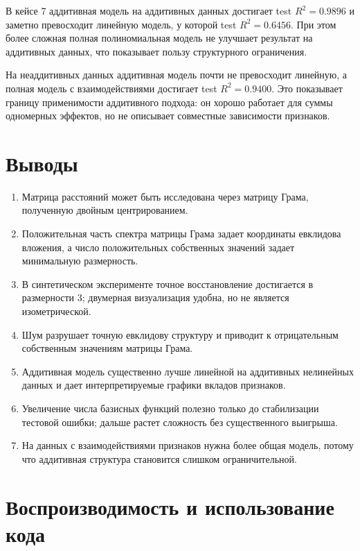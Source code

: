 \documentclass[12pt,a4paper]{article}
\begin{document}
В кейсе 7 аддитивная модель на аддитивных данных достигает test \(R^2=0.9896\)
и заметно превосходит линейную модель, у которой test \(R^2=0.6456\). При этом
более сложная полная полиномиальная модель не улучшает результат на аддитивных
данных, что показывает пользу структурного ограничения.

На неаддитивных данных аддитивная модель почти не превосходит линейную, а
полная модель с взаимодействиями достигает test \(R^2=0.9400\). Это показывает
границу применимости аддитивного подхода: он хорошо работает для суммы
одномерных эффектов, но не описывает совместные зависимости признаков.

\section{Выводы}

\begin{enumerate}[label=\arabic*)]
    \item Матрица расстояний может быть исследована через матрицу Грама,
    полученную двойным центрированием.

    \item Положительная часть спектра матрицы Грама задает координаты
    евклидова вложения, а число положительных собственных значений задает
    минимальную размерность.

    \item В синтетическом эксперименте точное восстановление достигается
    в размерности \(3\); двумерная визуализация удобна, но не является
    изометрической.

    \item Шум разрушает точную евклидову структуру и приводит к отрицательным
    собственным значениям матрицы Грама.

    \item Аддитивная модель существенно лучше линейной на аддитивных
    нелинейных данных и дает интерпретируемые графики вкладов признаков.

    \item Увеличение числа базисных функций полезно только до стабилизации
    тестовой ошибки; дальше растет сложность без существенного выигрыша.

    \item На данных с взаимодействиями признаков нужна более общая модель,
    потому что аддитивная структура становится слишком ограничительной.
\end{enumerate}

\section{Воспроизводимость и использование кода}
\end{document}
